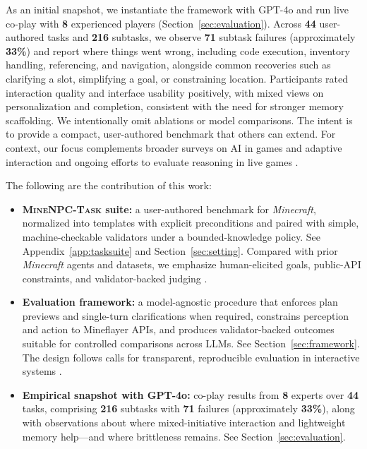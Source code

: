 As an initial snapshot, we instantiate the framework with GPT-4o and run live co-play with \textbf{8} experienced players (Section~\ref{sec:evaluation}). Across \textbf{44} user-authored tasks and \textbf{216} subtasks, we observe \textbf{71} subtask failures (approximately \textbf{33\%}) and report where things went wrong, including code execution, inventory handling, referencing, and navigation, alongside common recoveries such as clarifying a slot, simplifying a goal, or constraining location. Participants rated interaction quality and interface usability positively, with mixed views on personalization and completion, consistent with the need for stronger memory scaffolding. We intentionally omit ablations or model comparisons. The intent is to provide a compact, user-authored benchmark that others can extend. For context, our focus complements broader surveys on AI in games and adaptive interaction \citep{yannakakis2018artificial, Riedl2021} and ongoing efforts to evaluate reasoning in live games \citep{hu2024gamearena}.


The following are the contribution of this work:
\begin{itemize}[leftmargin=*, itemsep=2pt, topsep=2pt]
  \item \textbf{\textsc{MineNPC-Task} suite:} a user-authored benchmark for \emph{Minecraft}, normalized into templates with explicit preconditions and paired with simple, machine-checkable validators under a bounded-knowledge policy. See Appendix~\ref{app:tasksuite} and Section~\ref{sec:setting}. Compared with prior \emph{Minecraft} agents and datasets, we emphasize human-elicited goals, public-API constraints, and validator-backed judging \citep{johnson2016the,fan2022minedojo,wang2023voyager}.
  \item \textbf{Evaluation framework:} a model-agnostic procedure that enforces plan previews and single-turn clarifications when required, constrains perception and action to Mineflayer APIs, and produces validator-backed outcomes suitable for controlled comparisons across LLMs. See Section~\ref{sec:framework}. The design follows calls for transparent, reproducible evaluation in interactive systems \citep{Jennings2024,hu2024gamearena}.
  \item \textbf{Empirical snapshot with GPT-4o:} co-play results from \textbf{8} experts over \textbf{44} tasks, comprising \textbf{216} subtasks with \textbf{71} failures (approximately \textbf{33\%}), along with observations about where mixed-initiative interaction and lightweight memory help—and where brittleness remains. See Section~\ref{sec:evaluation}.
\end{itemize}